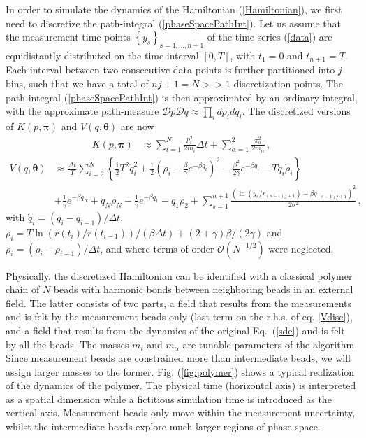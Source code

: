 \documentclass[11pt]{article}
\theoremstyle{definition}
\newcommand{\bt}{\pmb\theta}
\begin{document}
In order to simulate the dynamics of the Hamiltonian (\ref{Hamiltonian}), we first need to discretize the path-integral (\ref{phaseSpacePathInt}).
Let us assume that the measurement time points $\left\{ y_s \right\}_{s=1,\dots, n+1}$ of the time series (\ref{data}) are equidistantly distributed on the time interval $[0,T]$, with $t_1=0$ and $t_{n+1}=T$.
Each interval between two consecutive data points is further partitioned into $j$ bins, such that we have a total of $nj+1=N>>1$ discretization points.
The path-integral (\ref{phaseSpacePathInt}) is then approximated by an ordinary integral, with the approximate path-measure $  \mathcal Dp\mathcal Dq  \approx  \prod_i dp_i dq_i$.
The discretized versions of $K( p,{\pmb\pi})$ and $V( q,\bt)$ are now
\begin{align}
   K( p,{\pmb\pi}) &\approx
   \sum_{i=1}^N
   \frac{ p_i^2}{2m_i}\Delta t
   +
   \sum_{\alpha=1}^2\frac{\pi_\alpha^2}{2m_\alpha}\,,\label{Kdisc}
\end{align}
\begin{align} \label{Vdisc}
  V(q,\bt)  &\approx \frac{\Delta t}{T} \sum_{i=2}^{N}
   \left\{ \frac{1}{2} T^2 \dot q_i^2 + \frac{1}{2}
     \left( \rho_i-\frac{\beta}{\gamma}e^{-\beta q_i} \right)^2 -
    \frac{\beta^2}{2\gamma} e^{-\beta q_i} - T q_i\dot\rho_i \right\}
  \\ \nonumber
  &+
  \frac{1}{\gamma} e^{-\beta q_N} + q_N \rho_{N} - \frac{1}{\gamma} e^{-\beta q_1} -  q_1 \rho_{2} +
  \sum_{s=1}^{n+1} \frac{(\ln(y_s/r_{(s-1)j+1}) - {\beta q_{(s-1)j+1}})^2}{2\sigma^2}\,,
\end{align}
with $\dot q_i = (q_i-q_{i-1})/\Delta t$, $\rho_i = T \ln(r(t_{i})/r(t_{i-1}))/(\beta\Delta t)+(2+\gamma)\beta/(2\gamma)$ and $\dot\rho_i = (\rho_i-\rho_{i-1})/\Delta t$, and where terms of order $\mathcal O(N^{-1/2})$ were neglected.

Physically, the discretized Hamiltonian can be identified with a classical polymer chain of $N$ beads with harmonic bonds between neighboring beads in an external field.
The latter consists of two parts, a field that results from the measurements and is felt by the measurement beads only (last term on the r.h.s. of eq. \ref{Vdisc}), and a field that results from the dynamics of the original Eq.~(\ref{sde}) and is felt by all the beads.
The masses $m_i$ and $m_{\alpha}$ are tunable parameters of the algorithm. Since measurement beads are constrained more than intermediate beads, we will assign larger masses to the former. Fig. (\ref{fig:polymer}) shows a typical realization of the dynamics of the polymer. The physical time (horizontal axis) is interpreted as a spatial dimension while a fictitious simulation time is introduced as the vertical axis. Measurement beads only move within the measurement uncertainty, whilst the intermediate beads explore much larger regions of phase space.
\end{document}
